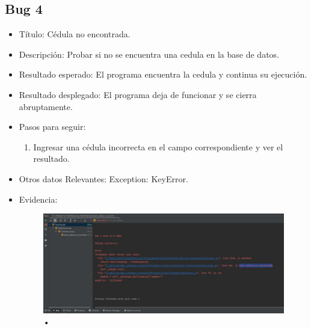 \documentclass[conference]{IEEEtran}
\begin{document}
\subsection*{Bug 4}
\begin{itemize}
\item Título: Cédula no encontrada.

\item Descripción: Probar si no se encuentra una cedula en la base de datos.

\item Resultado esperado: El programa encuentra la cedula y continua su ejecución.

\item Resultado desplegado: El programa deja de funcionar y se cierra abruptamente.
 
\item Pasos para seguir: 
\begin{enumerate}
\item Ingresar una cédula incorrecta en el campo correspondiente y ver el resultado.
\end{enumerate}
\item Otros datos Relevantes: Exception: KeyError.
\item Evidencia:
\begin{figure}[H]
\centering
\includegraphics[scale=0.2]{imagenes/cedula_no_encontrada.jpeg}
\caption{•}
\end{figure}

\end{itemize}
\end{document}
